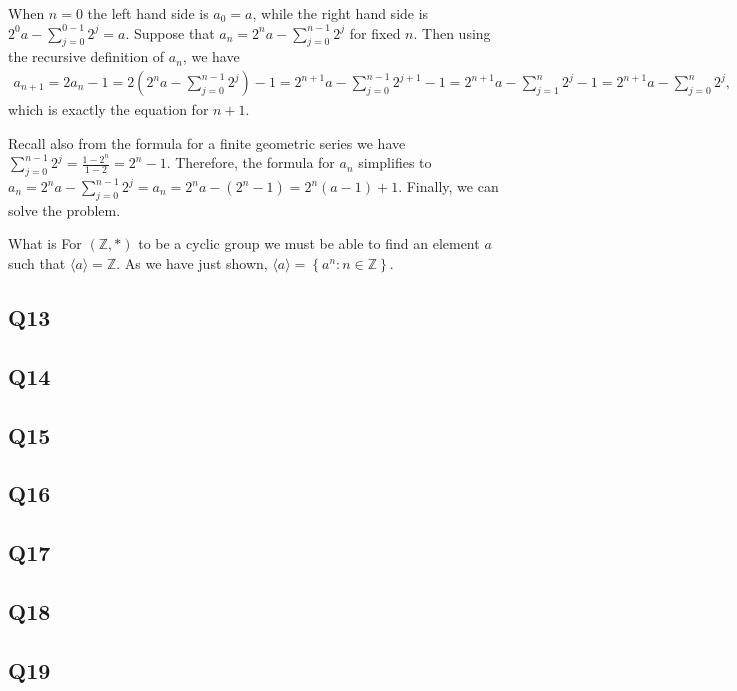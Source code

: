 \documentclass[12pt]{article}
\def\Z{{\mathbb Z}}        %
\numberwithin{theorem}{section}
\numberwithin{equation}{section}
\numberwithin{remark}{section}
\numberwithin{definition}{section}
\numberwithin{theorem}{section}
\numberwithin{lemma}{section}
\numberwithin{example}{section}
\begin{document}
When $n=0$ the left hand side is $a_0=a$, while the right hand side is $2^0a-\sum_{j=0}^{0-1}2^j=a$. Suppose that $a_n=2^na-\sum_{j=0}^{n-1}2^j$ for fixed $n$. Then using the recursive definition of $a_n$, we have
\begin{align*}
	a_{n+1}=2a_{n}-1=2\left(2^na-\sum_{j=0}^{n-1}2^j\right)-1=2^{n+1}a-\sum_{j=0}^{n-1}2^{j+1}-1=2^{n+1}a-\sum_{j=1}^{n}2^{j}-1=2^{n+1}a-\sum_{j=0}^{n}2^{j},
\end{align*}
which is exactly the equation for $n+1$. 

Recall also from the formula for a finite geometric series we have $\sum_{j=0}^{n-1}2^j=\frac{1-2^n}{1-2}=2^n-1$. Therefore, the formula for $a_n$ simplifies to $a_n=2^na-\sum_{j=0}^{n-1}2^j=a_n=2^na-(2^n-1)=2^n(a-1)+1$. Finally, we can solve the problem. 

What is 
For $\left(\Z,*\right)$ to be a cyclic group we must be able to find an element $a$ such that $\langle a \rangle=\Z$. As we have just shown, $\langle a \rangle=\left\{a^n:n\in\Z\right\}$. 



\subsection{Q13}

\subsection{Q14}

\subsection{Q15}

\subsection{Q16}

\subsection{Q17}

\subsection{Q18}

\subsection{Q19}
\end{document}
